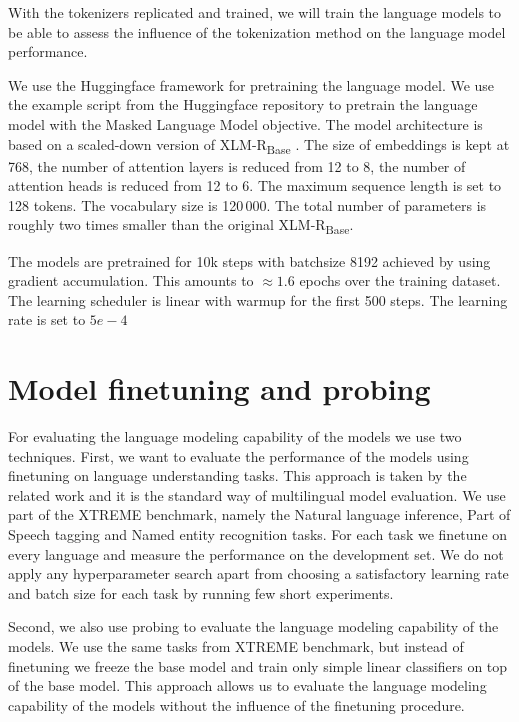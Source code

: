 With the tokenizers replicated and trained, we will train the language models to be able to assess the influence of the tokenization method on the language model performance.

We use the Huggingface framework \cite{wolf_transformers_2020} for pretraining the language model. We use the example script from the Huggingface repository to pretrain the language model with the Masked Language Model objective. The model architecture is based on a scaled-down version of XLM-R\textsubscript{Base} \cite{conneau_unsupervised_2020}. The size of embeddings is kept at 768, the number of attention layers is reduced from 12 to 8, the number of attention heads is reduced from 12 to 6. The maximum sequence length is set to 128 tokens. The vocabulary size is 120\,000. The total number of parameters is roughly two times smaller than the original XLM-R\textsubscript{Base}.

The models are pretrained for 10k steps with batchsize 8192 achieved by using gradient accumulation. This amounts to $\approx 1.6$ epochs over the training dataset. The learning scheduler is linear with warmup for the first 500 steps. The learning rate is set to $5e-4$

\section{Model finetuning and probing}

For evaluating the language modeling capability of the models we use two techniques. First, we want to evaluate the performance of the models using finetuning on language understanding tasks. This approach is taken by the related work and it is the standard way of multilingual model evaluation. We use part of the XTREME benchmark, namely the Natural language inference, Part of Speech tagging and Named entity recognition tasks. For each task we finetune on every language and measure the performance on the development set. We do not apply any hyperparameter search apart from choosing a satisfactory learning rate and batch size for each task by running few short experiments. 

Second, we also use probing \cite{conneau_what_2018,belinkov_interpretability_2020,blevins_analyzing_2022} to evaluate the language modeling capability of the models. We use the same tasks from XTREME benchmark, but instead of finetuning we freeze the base model and train only simple linear classifiers on top of the base model. This approach allows us to evaluate the language modeling capability of the models without the influence of the finetuning procedure. 

